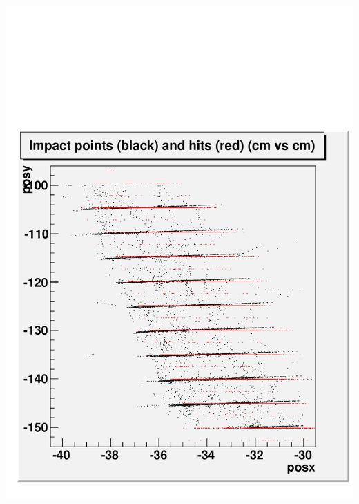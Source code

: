 \documentclass[compress]{beamer}
\begin{document}
\begin{frame}
\vfill
\begin{columns}
\includegraphics[width=\linewidth]{selectioneffect_nocut.pdf}

\end{columns}
\end{frame}
\end{document}
